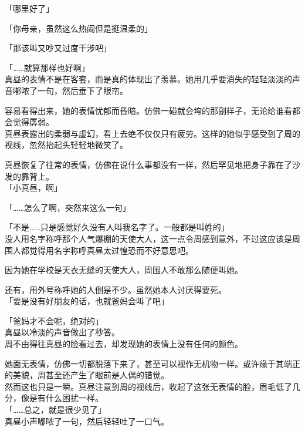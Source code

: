 「哪里好了」

「你母亲，虽然这么热闹但是挺温柔的」

「那该叫又吵又过度干涉吧」

「……就算那样也好啊」\\

真昼的表情不是在客套，而是真的体现出了羡慕。她用几乎要消失的轻轻淡淡的声音嘟哝了一句，然后垂下了眼帘。

容易看得出来，她的表情忧郁而昏暗。仿佛一碰就会垮的那副样子，无论给谁看都会觉得孱弱。\\

真昼表露出的柔弱与虚幻，看上去绝不仅仅只有疲劳。这样的她似乎感受到了周的视线，忽然抬起头轻轻地微笑了。

真昼恢复了往常的表情，仿佛在说什么事都没有一样，然后罕见地把身子靠在了沙发的靠背上。\\

「小真昼，啊」

「……怎么了啊，突然来这么一句」

「不是……只是感觉好久没有人叫我名字了。一般都是叫姓的」\\

没人用名字称呼那个人气爆棚的天使大人，这一点令周感到意外，不过这应该是周围人都觉得用名字称呼真昼太过惶恐而不好意思吧。

因为她在学校是天衣无缝的天使大人，周围人不敢那么随便叫她。

还有，用外号称呼她的人倒是不少。虽然她本人讨厌得要死。\\

「要是没有好朋友的话，也就爸妈会叫了吧」

「爸妈才不会呢，绝对的」\\

真昼以冷淡的声音做出了秒答。\\

周不由得往真昼的脸看过去，却发现她的表情上没有任何的颜色。

她面无表情，仿佛一切都脱落下来了，甚至可以视作无机物一样。或许缘于其端正的美貌，周甚至还产生了眼前是人偶的错觉。\\

然而这也只是一瞬。真昼注意到周的视线后，收起了这张无表情的脸，眉毛低了几分，像是有什么困扰一样。\\

「……总之，就是很少见了」\\

真昼小声嘟哝了一句，然后轻轻吐了一口气。\\

